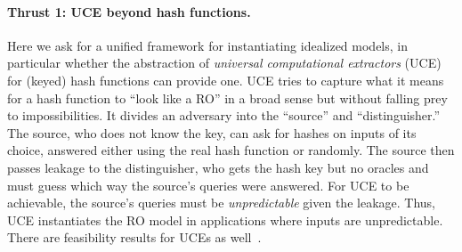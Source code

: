  \iffalse
\paragraph*{Thrust 1: UCE beyond hash functions.}
Here we ask for a unified framework for instantiating idealized models, in particular whether the abstraction of \emph{universal computational extractors} (UCE)~\cite{C:BelHoaKee13} for (keyed) hash functions can provide one.  UCE tries to capture what it means for  a hash function to ``look like a RO''  in a broad sense but without falling prey to impossibilities. It divides an adversary into the ``source'' and ``distinguisher.'' The source, who does not know the key, can ask for hashes on inputs of its choice,  answered either using the real hash function or randomly.  The source then passes leakage to the distinguisher, who gets the hash key but no oracles and must guess which way the source's queries were answered. For UCE to be achievable, the source's queries must be \emph{unpredictable} given the leakage. Thus, UCE instantiates the RO model in applications where inputs are unpredictable. There are feasibility results for UCEs as well~\cite{AC:BrzMit14a}. 

